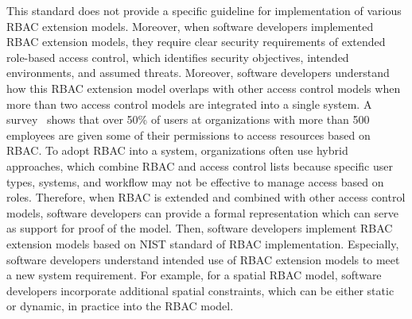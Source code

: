 This standard does not provide a specific guideline for implementation of various RBAC extension models.
Moreover, when software developers implemented RBAC extension models, they require clear security requirements of extended role-based access control, which identifies security objectives, intended environments, and assumed threats. 
Moreover, software developers understand how this RBAC extension model overlaps with other access control models when more than two access control models are integrated into a single system. 
A survey~\cite{o20102010} shows that over 50\% of users at organizations with more than 500 employees are given some of their permissions to access resources based on RBAC. 
To adopt RBAC into a system, organizations often use hybrid approaches, which combine RBAC and access control lists because specific user types, systems, and workflow may not be effective to manage access based on roles. 
Therefore, when RBAC is extended and combined with other access control models, software developers can provide a formal representation which can serve as support for proof of the model. 
Then, software developers implement RBAC extension models based on NIST standard of RBAC implementation. 
Especially, software developers understand intended use of RBAC extension models to meet a new system requirement. 
For example, for a spatial RBAC model, software developers incorporate additional spatial constraints, which can be either static or dynamic, in practice into the RBAC model.


